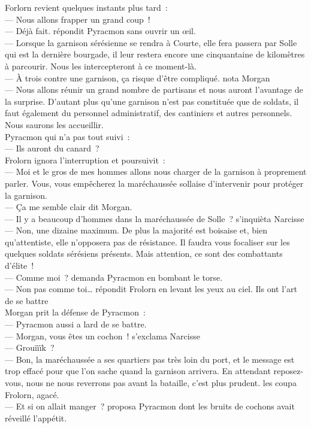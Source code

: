 \documentclass[french, a4paper, 12pt]{article}
\begin{document}
Forlorn revient quelques instants plus tard~:\\
--- Nous allons frapper un grand coup~!\\
--- Déjà fait. répondit Pyracmon sans ouvrir un œil.\\
--- Lorsque la garnison sérésienne se rendra à Courte, elle fera passera par Solle qui est la dernière bourgade, il leur restera encore une cinquantaine de kilomètres à parcourir. Nous les intercepteront à ce moment-là.\\
--- À trois contre une garnison, ça risque d'être compliqué. nota Morgan\\
--- Nous allons réunir un grand nombre de partisans et nous auront l'avantage de la surprise. D'autant plus qu'une garnison n'est pas constituée que de soldats, il faut également du personnel administratif, des cantiniers et autres personnels. Nous saurons les accueillir.\\
Pyracmon qui n'a pas tout suivi~:\\
--- Ils auront du canard~?\\
Frolorn ignora l'interruption et poursuivit~:\\
--- Moi et le gros de mes hommes allons nous charger de la garnison à proprement parler. Vous, vous empêcherez la maréchaussée sollaise d'intervenir pour protéger la garnison.\\
--- Ça me semble clair dit Morgan.\\
--- Il y a beaucoup d'hommes dans la maréchaussée de Solle~? s'inquièta Narcisse\\
--- Non, une dizaine maximum. De plus la majorité est boisaise et, bien qu'attentiste, elle n'opposera pas de résistance. Il faudra vous focaliser sur les quelques soldats sérésiens présents. Mais attention, ce sont des combattants d'élite~!\\
--- Comme moi~? demanda Pyracmon en bombant le torse.\\
--- Non pas comme toi… répondit Frolorn en levant les yeux au ciel. Ils ont l'art de se battre\\
Morgan prit la défense de Pyracmon~:\\
--- Pyracmon aussi a lard de se battre.\\
--- Morgan, vous êtes un cochon~! s'exclama Narcisse\\
--- Grouïïïk~?\\
--- Bon, la maréchaussée a ses quartiers pas très loin du port, et le message est trop effacé pour que l'on sache quand la garnison arrivera. En attendant reposez-vous, nous ne nous reverrons pas avant la bataille, c'est plus prudent. les coupa Frolorn, agacé.\\
--- Et si on allait manger~? proposa Pyracmon dont les bruits de cochons avait réveillé l'appétit.\\
\end{document}

